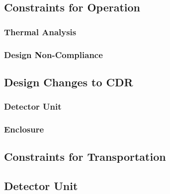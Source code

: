 \subsection{Constraints for Operation}

\subsubsection{Thermal Analysis}

\subsubsection{Design Non-Compliance}

\subsection{Design Changes to CDR}

\subsubsection{Detector Unit}

\subsubsection{Enclosure}


\subsection{Constraints for Transportation}

\subsection{Detector Unit}